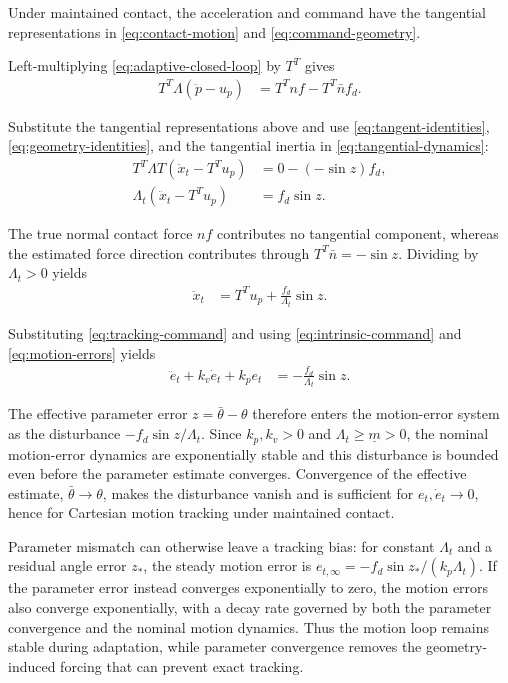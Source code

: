 \documentclass[10pt,journal,letterpaper]{IEEEtran}
\begin{document}
Under maintained contact, the acceleration and command have the tangential representations in \eqref{eq:contact-motion} and \eqref{eq:command-geometry}.

Left-multiplying \eqref{eq:adaptive-closed-loop} by $T^T$ gives
\begin{align*}
T^T\Lambda(\ddot p-u_p)
&=T^Tnf-T^T\bar n f_d.
\end{align*}

Substitute the tangential representations above and use \eqref{eq:tangent-identities}, \eqref{eq:geometry-identities}, and the tangential inertia in \eqref{eq:tangential-dynamics}:
\begin{align*}
T^T\Lambda T\left(\ddot x_t-T^Tu_p\right)
&=0-(-\sin z)f_d,\\
\Lambda_t\left(\ddot x_t-T^Tu_p\right)
&=f_d\sin z.
\end{align*}

The true normal contact force $nf$ contributes no tangential component, whereas the estimated force direction contributes through $T^T\bar n=-\sin z$. Dividing by $\Lambda_t>0$ yields
\begin{align*}
\ddot x_t&=T^Tu_p+\frac{f_d}{\Lambda_t}\sin z.
\end{align*}

Substituting \eqref{eq:tracking-command} and using \eqref{eq:intrinsic-command} and \eqref{eq:motion-errors} yields
\begin{equation}\label{eq:adaptive-motion-error}
\begin{aligned}
\ddot e_t+k_v\dot e_t+k_pe_t
&=-\frac{f_d}{\Lambda_t}\sin z.
\end{aligned}
\end{equation}

The effective parameter error $z=\bar\theta-\theta$ therefore enters the motion-error system as the disturbance $-f_d\sin z/\Lambda_t$. Since $k_p,k_v>0$ and $\Lambda_t\geq\underline m>0$, the nominal motion-error dynamics are exponentially stable and this disturbance is bounded even before the parameter estimate converges. Convergence of the effective estimate, $\bar\theta\to\theta$, makes the disturbance vanish and is sufficient for $e_t,\dot e_t\to0$, hence for Cartesian motion tracking under maintained contact.

Parameter mismatch can otherwise leave a tracking bias: for constant $\Lambda_t$ and a residual angle error $z_*$, the steady motion error is $e_{t,\infty}=-f_d\sin z_*/(k_p\Lambda_t)$. If the parameter error instead converges exponentially to zero, the motion errors also converge exponentially, with a decay rate governed by both the parameter convergence and the nominal motion dynamics. Thus the motion loop remains stable during adaptation, while parameter convergence removes the geometry-induced forcing that can prevent exact tracking.
\end{document}
